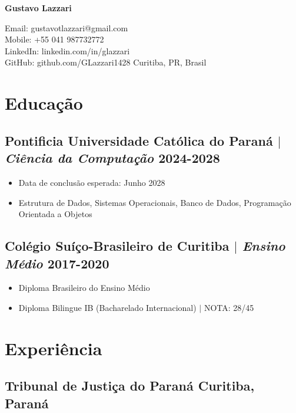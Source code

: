\documentclass[11pt]{article} %
\begin{document}
\begin{center}
	\begin{minipage}{0.5\textwidth}
		{\Huge\bfseries
			Gustavo Lazzari %
		} \\ \medskip
	\end{minipage} \hfill
	\begin{minipage}{0.4\textwidth}
		\raggedleft
		Email: gustavotlazzari@gmail.com \\
		Mobile: +55 041 987732772 \\
		LinkedIn: linkedin.com/in/glazzari \\
		GitHub: github.com/GLazzari1428
		Curitiba, PR, Brasil
	\end{minipage}
\end{center}

\section{Educação}
\subsection{Pontificia Universidade Católica do Paraná $|$ {\normalfont\itshape Ciência da Computação} \hfill 2024-2028}
\begin{itemize}
	\item Data de conclusão esperada: Junho 2028
	\item Estrutura de Dados, Sistemas Operacionais, Banco de Dados, Programação Orientada a Objetos
\end{itemize}
\subsection{Colégio Suíço-Brasileiro de Curitiba $|$ {\normalfont\itshape Ensino Médio} \hfill 2017-2020}
\begin{itemize}
	\item Diploma Brasileiro do Ensino Médio
	\item Diploma Bilingue IB (Bacharelado Internacional) $|$ NOTA: 28/45
\end{itemize}

\section{Experiência}
\subsection{Tribunal de Justiça do Paraná \hfill Curitiba, Paraná}
\end{document}
